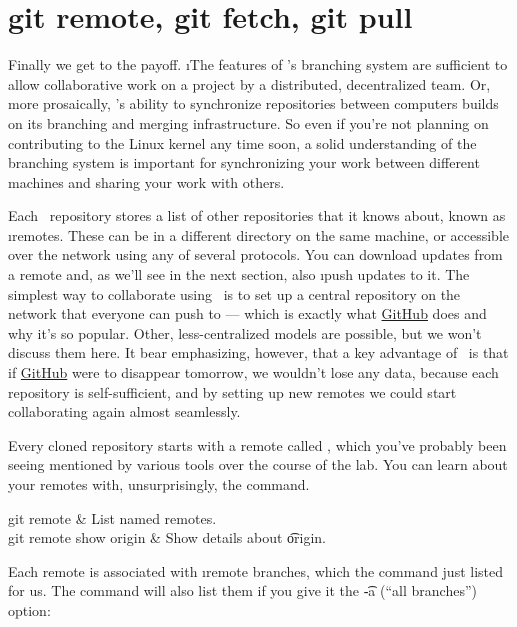 \documentclass[letterpaper,12pt,titlepage,twoside]{article}
\begin{document}
\section{git remote, git fetch, git pull}

Finally we get to the payoff. \i{The features of \git's branching system are
  sufficient to allow collaborative work on a project by a distributed,
  decentralized team.} Or, more prosaically, \git's ability to synchronize
repositories between computers builds on its branching and merging
infrastructure. So even if you're not planning on contributing to the Linux
kernel any time soon, a solid understanding of the branching system is
important for synchronizing your work between different machines and sharing
your work with others.

Each \git\ repository stores a list of other repositories that it knows about,
known as \i{remotes}. These can be in a different directory on the same
machine, or accessible over the network using any of several protocols. You
can download updates from a remote and, as we'll see in the next section, also
\i{push} updates to it. The simplest way to collaborate using \git\ is to set
up a central repository on the network that everyone can push to --- which is
exactly what \href{https://github.com/}{GitHub} does and why it's so popular.
Other, less-centralized models are possible, but we won't discuss them here.
It bear emphasizing, however, that a key advantage of \git\ is that if
\href{https://github.com/}{GitHub} were to disappear tomorrow, we wouldn't
lose any data, because each repository is self-sufficient, and by setting up
new remotes we could start collaborating again almost seamlessly.

Every cloned repository starts with a remote called , which you've
probably been seeing mentioned by various tools over the course of the lab.
You can learn about your remotes with, unsurprisingly, the 
command.

\begin{typeme}
git remote & List named remotes. \\
git remote show origin & Show details about \t{origin}.
\end{typeme}

Each remote is associated with \i{remote branches}, which the  command just listed for us. The  command will also list
them if you give it the \t{-a} (``all branches'') option:

\end{document}
